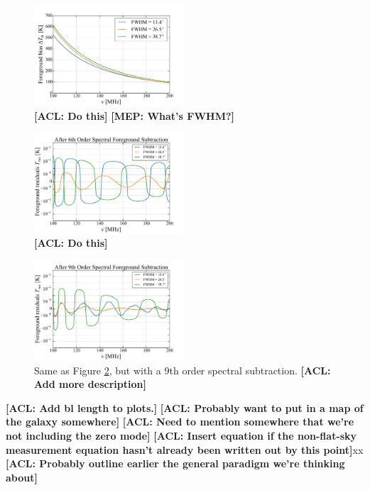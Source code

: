 \documentclass[twolcolumn,apj,iop,numberedappendix]{emulateapj}
\newcommand{\acl}[1]{{\color{red} \textbf{[ACL:  #1]}}}
\newcommand{\mep}[1]{{\color{applegreen} \textbf{[MEP:  #1]}}}
\begin{document}
\begin{figure}[h]
	\centering
	\includegraphics[width=0.50\textwidth]{figures/unsub_T0_beamSize.pdf}
	\caption{\acl{Do this}\mep{What's FWHM?}}
	\label{fig:unsub_T0_beamSize}
\end{figure}

\begin{figure}[h]
	\centering
	\includegraphics[width=0.50\textwidth]{figures/subPoly6_T0_beamSize.pdf}
	\caption{\acl{Do this}}
	\label{fig:subPoly6_T0_beamSize}
\end{figure}

\begin{figure}[h]
	\centering
	\includegraphics[width=0.50\textwidth]{figures/subPoly9_T0_beamSize.pdf}
	\caption{Same as Figure \ref{fig:subPoly6_T0_beamSize}, but with a $9$th order spectral subtraction. \acl{Add more description}}
	\label{fig:subPoly9_T0_beamSize}
\end{figure}

\acl{Add bl length to plots.}
\acl{Probably want to put in a map of the galaxy somewhere}
\acl{Need to mention somewhere that we're not including the zero mode}
\acl{Insert equation if the non-flat-sky measurement equation hasn't already been written out by this point}xx
\acl{Probably outline earlier the general paradigm we're thinking about}
\end{document}
